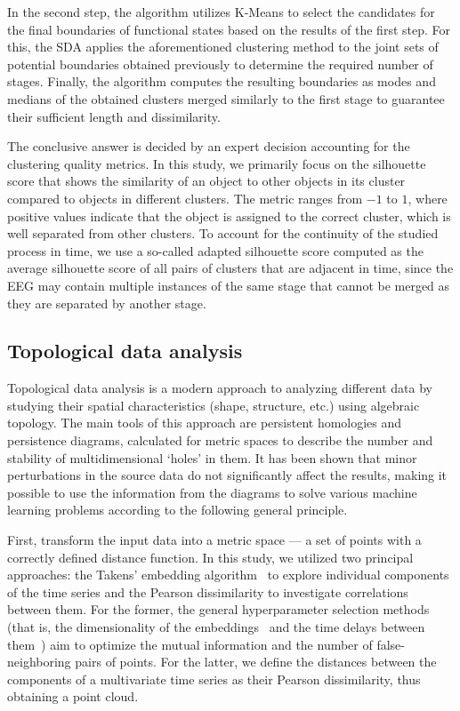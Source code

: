 \documentclass[pdflatex,sn-basic,Numbered]{sn-jnl}
\begin{document}
In the second step, the algorithm utilizes K-Means to select the candidates for the final boundaries of functional states based on the results of the first step. For this, the SDA applies the aforementioned clustering method to the joint sets of potential boundaries obtained previously to determine the required number of stages. Finally, the algorithm computes the resulting boundaries as modes and medians of the obtained clusters merged similarly to the first stage to guarantee their sufficient length and dissimilarity.

The conclusive answer is decided by an expert decision accounting for the clustering quality metrics. In this study, we primarily focus on the silhouette score that shows the similarity of an object to other objects in its cluster compared to objects in different clusters. The metric ranges from $-1$ to $1$, where positive values indicate that the object is assigned to the correct cluster, which is well separated from other clusters. To account for the continuity of the studied process in time, we use a so-called adapted silhouette score computed as the average silhouette score of all pairs of clusters that are adjacent in time, since the EEG may contain multiple instances of the same stage that cannot be merged as they are separated by another stage.


\subsection{Topological data analysis}

Topological data analysis is a modern approach to analyzing different data by studying their spatial characteristics (shape, structure, etc.) using algebraic topology. The main tools of this approach are persistent homologies and persistence diagrams, calculated for metric spaces to describe the number and stability of multidimensional `holes' in them. It has been shown that minor perturbations in the source data do not significantly affect the results, making it possible to use the information from the diagrams to solve various machine learning problems according to the following general principle.

First, transform the input data into a metric space --- a set of points with a correctly defined distance function. In this study, we utilized two principal approaches: the Takens' embedding algorithm~\cite{10.1007/BFb0091924,perea2013slidingwindowspersistenceapplication} to explore individual components of the time series and the Pearson dissimilarity to investigate correlations between them. For the former, the general hyperparameter selection methods (that is, the dimensionality of the embeddings~\cite{PhysRevA.45.3403} and the time delays between them~\cite{PhysRevA.33.1134}) aim to optimize the mutual information and the number of false-neighboring pairs of points. For the latter, we define the distances between the components of a multivariate time series as their Pearson dissimilarity, thus obtaining a point cloud.
\end{document}
